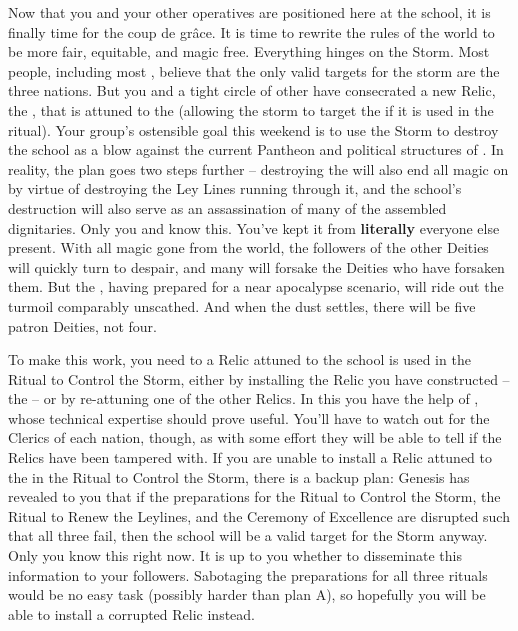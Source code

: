 \documentclass[char]{GL2020}
\begin{document}
Now that you and your other operatives are positioned here at the school, it is finally time for the coup de grâce. It is time to rewrite the rules of the world to be more fair, equitable, and magic free. Everything hinges on the Storm. Most people, including most \pGoaties{}, believe that the only valid targets for the storm are the three nations. But you and a tight circle of other \pGoaties{} have consecrated a new Relic, the \iHorseshoe{}, that is attuned to the \pSchool{} (allowing the storm to target the \pSc{} if it is used in the ritual). Your group's ostensible goal this weekend is to use the Storm to destroy the school as a blow against the current Pantheon and political structures of \pEarth{}. In reality, the plan goes two steps further -- destroying the \pSc{} will also end all magic on \pEarth{} by virtue of destroying the Ley Lines running through it, and the school's destruction will also serve as an assassination of many of the assembled dignitaries. Only you and \cChupSecond{} know this. You've kept it from \textbf{literally} everyone else present. With all magic gone from the world, the followers of the other Deities will quickly turn to despair, and many will forsake the Deities who have forsaken them. But the \pGoaties{}, having prepared for a near apocalypse scenario, will ride out the turmoil comparably unscathed. And when the dust settles, there will be five patron Deities, not four.

To make this work, you need to a Relic attuned to the school is used in the Ritual to Control the Storm, either by installing the Relic you have constructed – the \iHorseshoe{} – or by re-attuning one of the other Relics. In this you have the help of \cChupInventor{}, whose technical expertise should prove useful. You'll have to watch out for the Clerics of each nation, though, as with some effort they will be able to tell if the Relics have been tampered with. If you are unable to install a Relic attuned to the \pSc{} in the Ritual to Control the Storm, there is a backup plan: Genesis has revealed to you that if the preparations for the Ritual to Control the Storm, the Ritual to Renew the Leylines, and the Ceremony of Excellence are disrupted such that all three fail, then the school will be a valid target for the Storm anyway. Only you know this right now. It is up to you whether to disseminate this information to your followers. Sabotaging the preparations for all three rituals would be no easy task (possibly harder than plan A), so hopefully you will be able to install a corrupted Relic instead. 
\end{document}
